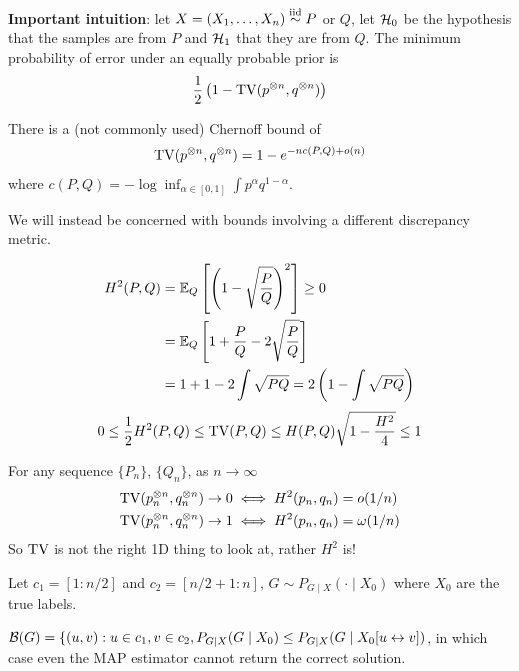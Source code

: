 \textbf{Important intuition}: let $X = (X_1, \ldots, X_n) \overset{\text{iid}}{\sim} P$ or $Q$,
let $\mathcal{H}_0$ be the hypothesis that the samples are from
$P$ and $\mathcal{H}_1$ that they are from $Q$. The minimum probability
of error under an equally probable prior is
\begin{align}
  \frac{1}{2} \left( 1 - \operatorname{TV}(p^{\otimes n}, q^{\otimes n})\right)
\end{align}

There is a (not commonly used) Chernoff bound of
\begin{align}
  \operatorname{TV}(p^{\otimes n}, q^{\otimes n}) = 1 - e^{-n c(P, Q) + o(n)}
\end{align}
where $c(P, Q) = -\log \inf_{\alpha \in [0,1]} \int p^\alpha q^{1-\alpha}$.

We will instead be concerned with bounds involving a different discrepancy
metric.

\begin{definition}
  \begin{align}
    H^2(P, Q)
    &= \mathbb{E}_Q\left[ \left(1 - \sqrt{\frac{P}{Q}}\right)^2 \right]
      \geq 0 \\
    &= \mathbb{E}_Q\left[
      1 + \frac{P}{Q} - 2 \sqrt{\frac{P}{Q}}
    \right] \\
    &= 1 + 1 - 2 \int \sqrt{PQ}
    = 2 \left( 1 - \int \sqrt{PQ} \right)
  \end{align}
  \begin{align}
    0 \leq \frac{1}{2} H^2(P, Q)
    \leq \operatorname{TV}(P, Q)
    \leq H(P, Q) \sqrt{1 - \frac{H^2}{4}}
    \leq 1
  \end{align}
\end{definition}

\begin{lemma}
  For any sequence $\{P_n\}$, $\{Q_n\}$, as $n \to \infty$
  \begin{align}
    \operatorname{TV}(p_n^{\otimes n}, q_n^{\otimes n}) \to 0 &\iff H^2(p_n, q_n) = o(1/n) \\
    \operatorname{TV}(p_n^{\otimes n}, q_n^{\otimes n}) \to 1 &\iff H^2(p_n, q_n) = \omega(1/n)
  \end{align}
  So $\operatorname{TV}$ is not the right 1D thing to look at, rather $H^2$ is!
\end{lemma}

Let $c_1 = [1:n/2]$ and $c_2 = [n/2+1:n]$,
$G \sim P_{G \mid X}(\cdot \mid X_0)$ where $X_0$ are the true labels.

\begin{definition}
  $\mathcal{B}(G)
  = \{ (u,v) :
    u \in c_1, v \in c_2, P_{G \mid X}(G \mid X_0) \leq P_{G \mid X}(G \mid X_0[u \leftrightarrow v])$,
    in which case even the MAP estimator cannot return the correct solution.
\end{definition}

